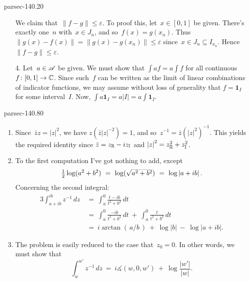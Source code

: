 \documentclass[b5page]{book}
\begin{document}
\begin{solution}{parsec-140.20}
\begin{enumerate}
We claim that~$\|f-g\|\leq \varepsilon$.
To proof this, let~$x\in [0,1]$ be given.
There's exactly one~$n$ with~$x\in J_n$,
and so~$f(x) = g(x_n)$.
Thus $\|g(x)-f(x)\|= \|g(x)-g(x_n)\|\leq \varepsilon$
since~$x\in J_n\subseteq I_{x_n}$.
Hence~$\|f-g\|\leq \varepsilon$.

\item[4.]
Let~$a\in\mathscr{A}$ be given.
We must show that
$\int af = a\int f$
for all continuous $f\colon [0,1]\to \mathbb{C}$.
Since such~$f$ can be written as the limit
of linear combinations
of indicator functions,
we may assume without loss of generality
that $f=\mathbf{1}_I$ for some interval~$I$.
Now,
$\int a \mathbf{1}_I = a \left|I\right|
= a \int \mathbf{1}_I$.
\end{enumerate}

\end{solution}
\begin{solution}{parsec-140.80}
    \begin{enumerate}
    \item
   Since~$\bar{z}z=\left|z\right|^2$,
            we have $z (\bar{z} \left|z\right|^{-2})=1$,
            and so~$z^{-1} = \bar{z} (\left|z\right|^2)^{-1}$.
This yields the required identity since
            $\bar{z}=z_{\mathbb{R}}-iz_{\mathbb{I}}$
            and $\left|z\right|^2 = z_{\mathbb{R}}^2+ z_{\mathbb{I}}^2$.
    \item
        To the first computation
            I've got nothing to add,
            except $$\textstyle \frac{1}{2}\log(a^2+b^2)
            \ =\  \smash{\log(\sqrt{a^2+b^2})} \ =\  
            \log\left|a+ib\right|.$$
    Concerning the second integral:
            \begin{alignat*}{3}
                \int_{a+ib}^{ib} z^{-1} \,dz 
                \ &=\ \int_a^0
                \frac{t-ib}{t^2+b^2}\,dt \\
                \ &=\ 
                \int_a^0
                \frac{-ib}{t^2+b^2}\,dt 
                \ +\ 
                \int_a^0
                \frac{t}{t^2+b^2}\,dt 
                \\
                \ &=\  i\arctan(\,a/b\,)
                \ + \  \log\left|b\right|
                \ - \ \log\left|a+ib\right|.
            \end{alignat*}
\item
The problem is easily reduced to the case that~$z_0=0$.
In other words,
we must show that
\begin{equation}
    \label{eq:14VIII}
    \int_w^{w'} z^{-1}
    \,dz \ =\ i\measuredangle(w,0,w')\ +\ \log\frac{\left|w'\right|}{\left|w\right|}.

\end{equation}
\end{enumerate}
\end{solution}
\end{document}
